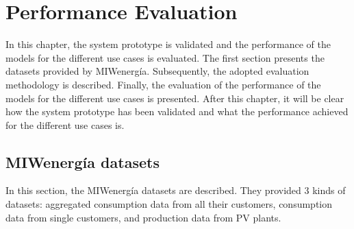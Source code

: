 \chapter{Performance Evaluation}
\label{cha:evaluation}
\vspace{0.4 cm}

In this chapter, the system prototype is validated and the performance of the models for the different use cases is evaluated.
The first section presents the datasets provided by MIWenergía.
Subsequently, the adopted evaluation methodology is described.
Finally, the evaluation of the performance of the models for the different use cases is presented.
After this chapter, it will be clear how the system prototype has been validated and what the performance achieved for the different use cases is.


\section{MIWenergía datasets}
\label{sec:datasets}
\vspace{0.2 cm}

In this section, the MIWenergía datasets are described.
They provided 3 kinds of datasets: aggregated consumption data from all their customers, consumption data from single customers, and production data from PV plants.

